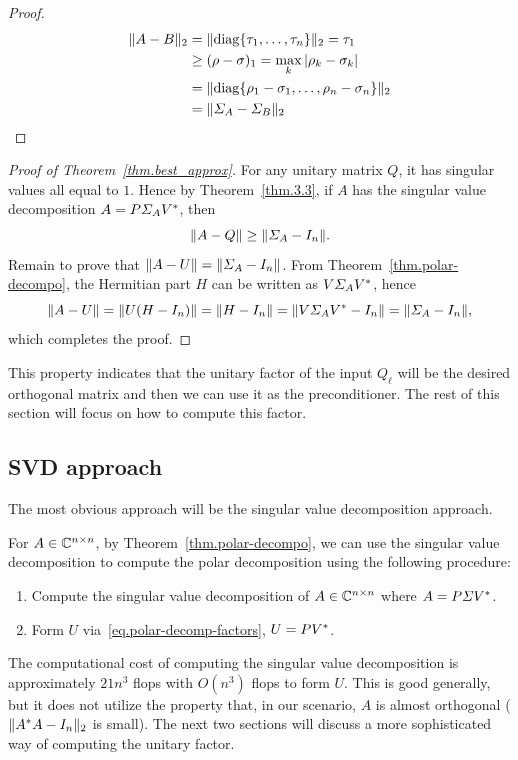 \begin{proof}
    \begin{equation}\notag
        \begin{aligned}
            \|{A-B}\|_2 &  = \|{\mathrm{diag}\{\tau_1,\dots,\tau_n\}}\|_2 = \tau_1 \\
            & \geq (\rho - \sigma)_1 = \max_k{\lvert\rho_k - \sigma_k\rvert}\\
            & = \|{\mathrm{diag}\{{\rho_1-\sigma_1},\dots,{\rho_n-\sigma_n}\}}\|_2 \\
            & = \|{\varSigma_A - \varSigma_B}\|_2 \qedhere
        \end{aligned} 
    \end{equation}
\end{proof}

\begin{proof}
    [Proof of Theorem~\ref{thm.best_approx}]
    For any unitary matrix $Q$, it has singular values all equal to $1$. Hence by Theorem~\ref{thm.3.3}, if $A$ has the singular value decomposition $A=P\varSigma_A V^*$, then $$\|{A-Q}\|\geq\|{\varSigma_A - I_n}\|.$$
    Remain to prove that $\|{A-U}\| = \|{\varSigma_A - I_n}\|$. From Theorem~\ref{thm.polar-decompo}, the Hermitian part $H$ can be written as $V\varSigma_A V^*$, hence 
    \begin{equation}\notag
        \|{A-U}\| = \|{U(H-I_n)}\| = \|{H-I_n}\| = \|{V \varSigma_A V^* - I_n}\| = \|{\varSigma_A - I_n}\|,
    \end{equation}
    which completes the proof.
\end{proof}

This property indicates that the unitary factor of the input $Q_\ell$ will be the desired orthogonal matrix and then we can use it as the preconditioner. The rest of this section will focus on how to compute this factor.

\subsection{SVD approach}\label{sec:svdapproach}

The most obvious approach will be the singular value decomposition approach.

For $A\in\mathbb{C}^{n\times n}$, by Theorem~\ref{thm.polar-decompo}, we can use the singular value decomposition to compute the polar decomposition using the following procedure:
\begin{enumerate}
    \item Compute the singular value decomposition of $A\in\mathbb{C}^{n\times n}$ where $A = P\varSigma V^*$.
    \item Form $U$ via~\eqref{eq.polar-decomp-factors}, $U = P V^*$.
\end{enumerate}
The computational cost of computing the singular value decomposition is approximately $21n^3$ flops  with $O(n^3)$ flops to form $U$. This is good generally, but it does not utilize the property that, in our scenario, $A$ is almost orthogonal ($\|{A^* A - I_n}\|_2$ is small). The next two sections will discuss a more sophisticated way of computing the unitary factor.

